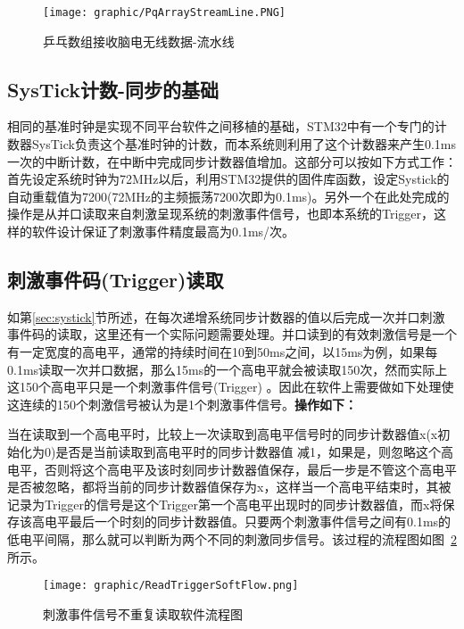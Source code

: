 \begin{figure}[!hbp]
\begin{center}
\texttt{[image: graphic/PqArrayStreamLine.PNG]}
\caption{乒乓数组接收脑电无线数据-流水线 \label{StreamLineArray}}
\end{center}
\end{figure}

\subsection{SysTick计数-同步的基础\label{sec:systick}}
	相同的基准时钟是实现不同平台软件之间移植的基础，STM32中有一个专门的计数器SysTick负责这个基准时钟的计数，而本系统则利用了这个计数器来产生0.1ms一次的中断计数，在中断中完成同步计数器值增加。这部分可以按如下方式工作：首先设定系统时钟为72MHz以后，利用STM32提供的固件库函数，设定Systick的自动重载值为7200(72MHz的主频振荡7200次即为0.1ms)。另外一个在此处完成的操作是从并口读取来自刺激呈现系统的刺激事件信号，也即本系统的Trigger，这样的软件设计保证了刺激事件精度最高为0.1ms/次。

\subsection{刺激事件码(Trigger)读取}
	如第\ref{sec:systick}节所述，在每次递增系统同步计数器的值以后完成一次并口刺激事件码的读取，这里还有一个实际问题需要处理。并口读到的有效刺激信号是一个有一定宽度的高电平，通常的持续时间在10到50ms之间，以15ms为例，如果每0.1ms读取一次并口数据，那么15ms的一个高电平就会被读取150次，然而实际上这150个高电平只是一个刺激事件信号(Trigger) 。因此在软件上需要做如下处理使这连续的150个刺激信号被认为是1个刺激事件信号。\textbf{操作如下：}

	当在读取到一个高电平时，比较上一次读取到高电平信号时的同步计数器值x(x初始化为0)是否是当前读取到高电平时的同步计数器值 减1，如果是，则忽略这个高电平，否则将这个高电平及该时刻同步计数器值保存，最后一步是不管这个高电平是否被忽略，都将当前的同步计数器值保存为x，这样当一个高电平结束时，其被记录为Trigger的信号是这个Trigger第一个高电平出现时的同步计数器值，而x将保存该高电平最后一个时刻的同步计数器值。只要两个刺激事件信号之间有0.1ms的低电平间隔，那么就可以判断为两个不同的刺激同步信号。该过程的流程图如图~\ref{readTrigger} 所示。

\begin{figure}[!hbp]
\begin{center}
\texttt{[image: graphic/ReadTriggerSoftFlow.png]}
\caption{刺激事件信号不重复读取软件流程图 \label{readTrigger}}
\end{center}
\end{figure}

